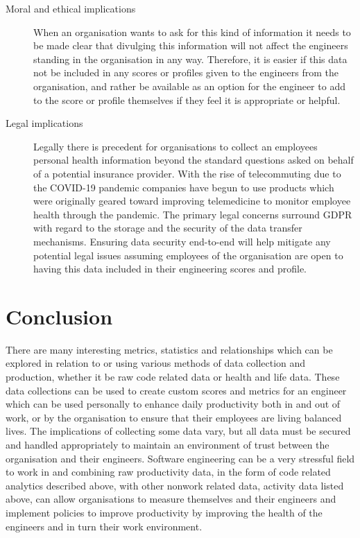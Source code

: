 \documentclass[11pt]{article}
\begin{document}
\begin{description}
        \begin{description}
            \item[Moral and ethical implications] When an organisation wants to ask for this kind of information it needs to be made clear that divulging this information will not affect the engineers standing in the organisation in any way. Therefore, it is easier if this data not be included in any scores or profiles given to the engineers from the organisation, and rather be available as an option for the engineer to add to the score or profile themselves if they feel it is appropriate or helpful.
            \item[Legal implications] Legally there is precedent for organisations to collect an employees personal health information beyond the standard questions asked on behalf of a potential insurance provider. With the rise of telecommuting due to the COVID-19 pandemic companies have begun to use products which were originally geared toward improving telemedicine to monitor employee health through the pandemic. The primary legal concerns surround GDPR with regard to the storage and the security of the data transfer mechanisms. Ensuring data security end-to-end will help mitigate any potential legal issues assuming employees of the organisation are open to having this data included in their engineering scores and profile.
        \end{description} 
    \end{description}
    
    \section*{Conclusion}
    There are many interesting metrics, statistics and relationships which can be explored in relation to or using various methods of data collection and production, whether it be raw code related data or health and life data. These data collections can be used to create custom scores and metrics for an engineer which can be used personally to enhance daily productivity both in and out of work, or by the organisation to ensure that their employees are living balanced lives. The implications of collecting some data vary, but all data must be secured and handled appropriately to maintain an environment of trust between the organisation and their engineers. Software engineering can be a very stressful field to work in and combining raw productivity data, in the form of code related analytics described above, with other nonwork related data, activity data listed above, can allow organisations to measure themselves and their engineers and implement policies to improve productivity by improving the health of the engineers and in turn their work environment.
    
\end{document}

